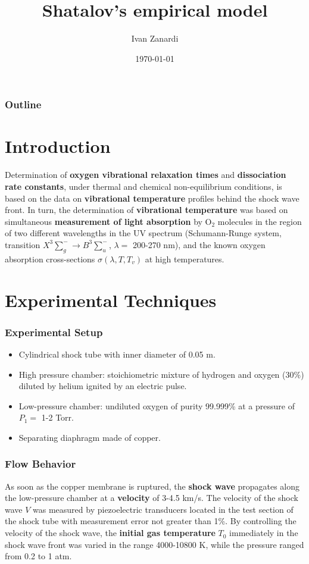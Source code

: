 \documentclass[10pt]{beamer}
\title{Shatalov's empirical model}
\author{Ivan Zanardi}
\institute{Politecnico di Milano}
\date{\today}
\begin{document}
\begin{frame}
\titlepage
\end{frame}

\begin{frame}
\frametitle{Outline}
\tableofcontents
\end{frame}


\section{Introduction}

\begin{frame}
Determination of \textbf{oxygen vibrational relaxation times} and
\textbf{dissociation rate constants}, under thermal and chemical non-equilibrium
conditions, is based on the data on \textbf{vibrational temperature} profiles
behind the shock wave front. \newline\newline
In turn, the determination of \textbf{vibrational temperature} was based on
simultaneous \textbf{measurement of light absorption} by O$_2$ molecules in the
region of two different wavelengths in the UV spectrum (Schumann-Runge system,
transition $X^3\sum_g^- \rightarrow B^3\sum_u^-$, $\lambda=$ 200-270 nm), and
the known oxygen absorption cross-sections $\sigma\left(\lambda,T,T_v\right)$ at
high temperatures.
\end{frame}


\section{Experimental Techniques}

\begin{frame}
\frametitle{Experimental Setup}
\begin{itemize}
	\item Cylindrical shock tube with inner diameter of 0.05 m.
	\item High pressure chamber: stoichiometric mixture of hydrogen and oxygen
	(30\%) diluted by helium ignited by an electric pulse.
	\item Low-pressure chamber: undiluted oxygen of purity 99.999\% at a pressure
	of $P_1=$ 1-2 Torr.
	\item Separating diaphragm made of copper.
\end{itemize}
\end{frame}

\begin{frame}
\frametitle{Flow Behavior}
As soon as the copper membrane is ruptured, the \textbf{shock wave} propagates
along the low-pressure chamber at a \textbf{velocity} of 3-4.5 km/s. The
velocity of the shock wave $V$ was measured by piezoelectric transducers located
in the test section of the shock tube with measurement error not greater than
1\%. \newline\newline
By controlling the velocity of the shock wave, the \textbf{initial gas
temperature} $T_0$ immediately in the shock wave front was varied in the range
4000-10800 K, while the pressure ranged from 0.2 to 1 atm.
\end{frame}
\end{document}
